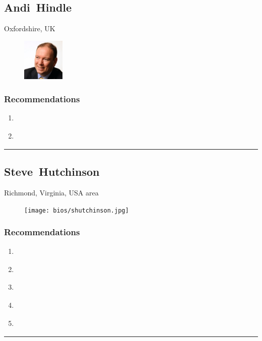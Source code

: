 \subsection{Andi~Hindle} \textsf{Oxfordshire, UK} \par \setlength{\columnsep}{0pt} \begin{figure} \centering \includegraphics[width=0.18\textwidth]{bios/ahindle.jpg} \end{figure} \textsf{  } \WFclear \subsubsection{Recommendations}\begin{enumerate}
\item \cite{Carlier2018}
\item \cite{Moore1991}
\end{enumerate}\noindent\rule{\textwidth}{0.2pt}

\subsection{Steve~Hutchinson} \textsf{Richmond, Virginia, USA area} \par \setlength{\columnsep}{0pt} \begin{figure} \centering \texttt{[image: bios/shutchinson.jpg]} \end{figure} \textsf{  } \WFclear \subsubsection{Recommendations}\begin{enumerate}
\item \cite{Birch2014}
\item \cite{Hardjono2016}
\item \cite{Nayyar2018}
\item \cite{Richer2017}
\item \cite{Schwartz2018}
\end{enumerate}\noindent\rule{\textwidth}{0.2pt}

